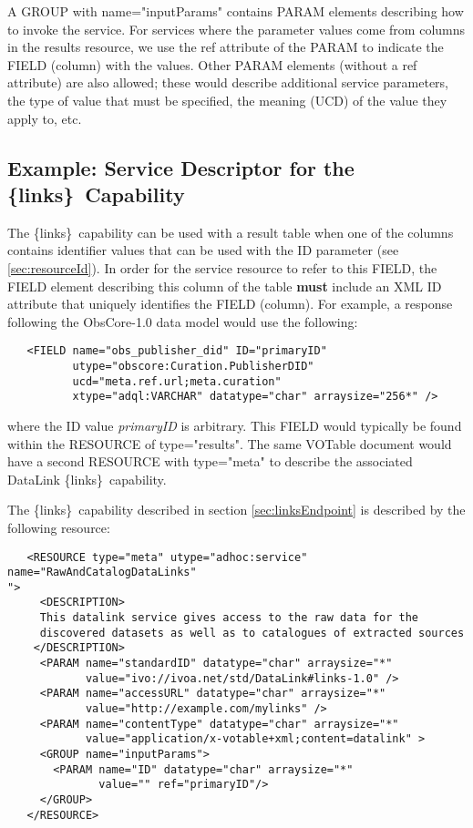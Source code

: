 \documentclass[11pt,a4paper]{ivoa}
\newcommand{\blinks}{\{links\}}
\newcommand{\attval}[2]{#1={\allowbreak}{"}#2{"}}
\begin{document}
A GROUP with \attval{name}{inputParams} contains PARAM elements describing
how to invoke the service. For services where the parameter values
come from columns in the results resource, we use the ref attribute of
the PARAM to indicate the FIELD (column) with the values. Other PARAM
elements (without a ref attribute) are also allowed; these would describe
additional service parameters, the type of value that must be specified,
the meaning (UCD) of the value they apply to, etc.


\subsection{Example: Service Descriptor for the \blinks\ Capability}

The \blinks\ capability can be used with a result table when one of the
columns contains identifier values that can be used with the ID parameter
(see \ref{sec:resourceId}).
In order for the service resource to refer to this FIELD,
the FIELD element describing this column of the table
{\bf must} include an XML ID attribute
that uniquely identifies the FIELD (column).
For example, a response following the ObsCore-1.0 data model
would use the following:
\begin{verbatim}
   <FIELD name="obs_publisher_did" ID="primaryID"
          utype="obscore:Curation.PublisherDID"
          ucd="meta.ref.url;meta.curation"
          xtype="adql:VARCHAR" datatype="char" arraysize="256*" />
\end{verbatim}
where the ID value {\em primaryID\/} is arbitrary.
This FIELD would typically
be found within the RESOURCE of \attval{type}{results}. The same VOTable
document would have a second RESOURCE with \attval{type}{meta} to describe
the associated DataLink \blinks\ capability.

The \blinks\ capability described in section \ref{sec:linksEndpoint}
is described by the following resource:
\begin{verbatim}
   <RESOURCE type="meta" utype="adhoc:service" name="RawAndCatalogDataLinks"
">
     <DESCRIPTION>
     This datalink service gives access to the raw data for the
     discovered datasets as well as to catalogues of extracted sources
    </DESCRIPTION>
     <PARAM name="standardID" datatype="char" arraysize="*"
            value="ivo://ivoa.net/std/DataLink#links-1.0" />
     <PARAM name="accessURL" datatype="char" arraysize="*"
            value="http://example.com/mylinks" />
     <PARAM name="contentType" datatype="char" arraysize="*" 
            value="application/x-votable+xml;content=datalink" >
     <GROUP name="inputParams">
       <PARAM name="ID" datatype="char" arraysize="*"
              value="" ref="primaryID"/>
     </GROUP>
   </RESOURCE>
\end{verbatim}
\end{document}
